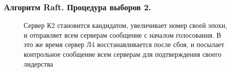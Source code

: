 \documentclass[pdf, 10pt, unicode,aspectratio=169]{beamer} %
\begin{document}
\begin{frame}
\frametitle{Алгоритм Raft. Процедура выборов 2.}


\begin{figure}[H]
\begin{minipage}[h]{0.49\linewidth}
\begin{small}
Сервер К2 становится кандидатом, увеличивает номер своей эпохи, и отправляет всем серверам сообщение с началом голосования. В это же время сервер Л4 восстанавливается после сбоя, и посылает контрольное сообщение всем серверам для подтверждения своего лидерства \\
\end{small}
\end{minipage}
\hfill
\begin{minipage}[h]{0.49\linewidth}

\end{minipage}
\end{figure}
\end{frame}
\end{document}
